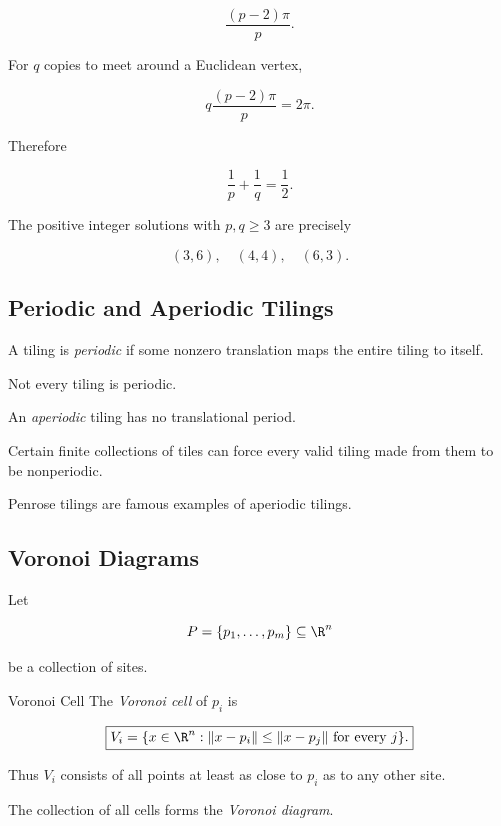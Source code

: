 \[
\boxed{
\frac{(p-2)\pi}{p}.
}
\]

For \(q\) copies to meet around a Euclidean vertex,

\[
q\frac{(p-2)\pi}{p}
=
2\pi.
\]

Therefore

\[
\boxed{
\frac1p+\frac1q=\frac12.
}
\]

The positive integer solutions with \(p,q\geq3\) are precisely

\[
\boxed{
(3,6),
\quad
(4,4),
\quad
(6,3).
}
\]

\subsection{Periodic and Aperiodic Tilings}
\label{subsec:periodic-aperiodic-tilings}

A tiling is \emph{periodic} if some nonzero translation maps the entire
tiling to itself.

Not every tiling is periodic.

An \emph{aperiodic} tiling has no translational period.

Certain finite collections of tiles can force every valid tiling made from
them to be nonperiodic.

Penrose tilings are famous examples of aperiodic tilings.

\subsection{Voronoi Diagrams}
\label{subsec:voronoi-diagrams}

Let

\[
P=\{p_1,\ldots,p_m\}\subseteq\R^n
\]

be a collection of sites.

\begin{definitionbox}{Voronoi Cell}
The \emph{Voronoi cell} of \(p_i\) is

\[
\boxed{
V_i
=
\{
x\in\R^n:
\|x-p_i\|
\leq
\|x-p_j\|
\text{ for every }j
\}.
}
\]
\end{definitionbox}

Thus \(V_i\) consists of all points at least as close to \(p_i\) as to any
other site.

The collection of all cells forms the \emph{Voronoi diagram}.

